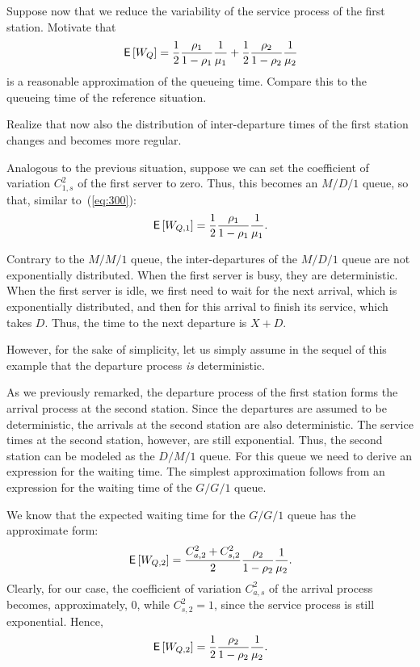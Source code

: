 \begin{exercise}
Suppose now that we reduce the variability of the service process of the first station.
Motivate that 
\begin{equation*}
  \,\mathsf{E}\left[W_Q\right]= \frac12\frac{\rho_1}{1-\rho_1} \frac1{\mu_1} +
  \frac12\frac{\rho_2}{1-\rho_2} \frac1{\mu_2}
\end{equation*}
is a reasonable approximation of the queueing time. Compare this to the queueing time of the reference situation.
  \begin{hint}
    Realize that now also the distribution of inter-departure times of the first station changes and becomes more regular.
  \end{hint}
  \begin{solution}
Analogous to the previous situation, suppose we can set the coefficient of variation
$C_{1,s}^2$ of the first server to zero. Thus, this becomes an $M/D/1$
queue, so that, similar to~(\ref{eq:300}):
\begin{equation*}
\,\mathsf{E}\left[W_{Q,1}\right] = \frac{1}2\frac{\rho_1}{1-\rho_1} \frac1{\mu_1}.
\end{equation*}

Contrary to the $M/M/1$ queue, the inter-departures of the $M/D/1$
queue are not exponentially distributed. When the first
server is busy, they are deterministic. When the first server is idle, we first
need to wait for the next arrival, which is exponentially distributed, and then for this arrival to finish its service, which
takes $D$. Thus, the time to the next departure is $X+D$.  

However, for the sake of simplicity, let us simply assume in the sequel of this
example that the departure process \emph{is} deterministic.

As we previously remarked, the departure process of the first station
forms the arrival process at the second station.  Since the departures
are assumed to be deterministic, the arrivals at the second station
are also deterministic.  The service times at the second station, however, are still
exponential.  Thus, the second station can be modeled as
the $D/M/1$ queue. For this queue we need to derive an expression for
the waiting time. The simplest approximation follows from an
expression for the waiting time of the $G/G/1$ queue.

We know that the expected waiting time for the $G/G/1$ queue has
the approximate form:
\begin{equation}\label{eq:500}
\,\mathsf{E}\left[W_{Q,2}\right] = \frac{C_{a,2}^2+C_{s,2}^2}2\frac{\rho_2}{1-\rho_2} \frac1{\mu_2}.
\end{equation}
Clearly, for our case, the coefficient of  variation $C_{a,s}^2$ of the
arrival process becomes, approximately, $0$, while $C_{s,2}^2 = 1$,
since the service process is still exponential. Hence,
\begin{equation}\label{eq:400}
\,\mathsf{E}\left[W_{Q,2}\right] = \frac12\frac{\rho_2}{1-\rho_2} \frac1{\mu_2}.
\end{equation}


\end{solution}
\end{exercise}
